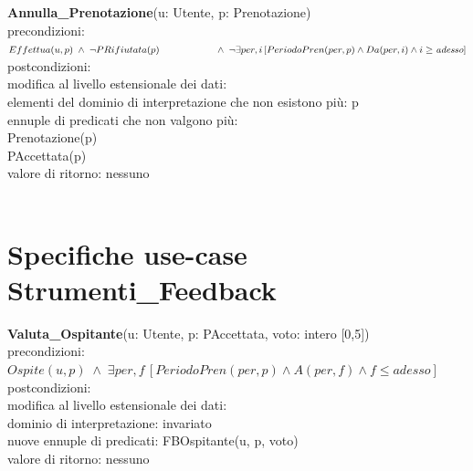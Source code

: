 \documentclass[a4paper,12pt]{report}
\begin{document}
        \hspace*{-1cm}
        \textbf{Annulla\_Prenotazione}(u: Utente, p: Prenotazione) \\
        \hspace*{1cm} precondizioni: $Effettua(u, p) \; \wedge \; \neg PRifiutata(p) \\
        \hspace*{2cm} \wedge \; \neg \exists per, i \, [PeriodoPren(per, p) \wedge Da(per, i) \wedge i \geq \textit{adesso}]$ \\
        \hspace*{1cm} postcondizioni: \\
        \hspace*{2cm} modifica al livello estensionale dei dati: \\
        \hspace*{3cm} elementi del dominio di interpretazione che non esistono più: p \\
        \hspace*{3cm} ennuple di predicati che non valgono più: \\
        \hspace*{4cm} Prenotazione(p) \\
        \hspace*{4cm} PAccettata(p) \\
        \hspace*{2cm} valore di ritorno: nessuno \\ \\

      \section*{Specifiche use-case Strumenti\_Feedback}
        \textbf{Valuta\_Ospitante}(u: Utente, p: PAccettata, voto: intero [0,5]) \\
        \hspace*{1cm} precondizioni: $Ospite(u, p) \; \wedge \; \exists per, f \, [PeriodoPren(per, p) \wedge A(per, f) \wedge f \leq \textit{adesso}]$ \\
        \hspace*{1cm} postcondizioni: \\
        \hspace*{2cm} modifica al livello estensionale dei dati: \\
        \hspace*{3cm} dominio di interpretazione: invariato \\
        \hspace*{3cm} nuove ennuple di predicati: FBOspitante(u, p, voto) \\
        \hspace*{2cm} valore di ritorno: nessuno \\ \\
\end{document}

